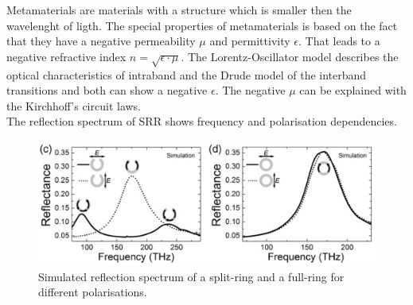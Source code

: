 Metamaterials are materials with a structure which is smaller then the wavelenght of ligth. The special properties of metamaterials is  based on the fact that they have a negative permeability $\mu$ and permittivity $\epsilon$. That leads to a negative refractive index $n = \sqrt{\epsilon \cdot \mu}$. 
The Lorentz-Oscillator model describes the optical characteristics of intraband  and the Drude model of the interband transitions and both can show  a negative $\epsilon$. The negative $\mu$ can be explained with the Kirchhoff's circuit laws. \\
The reflection spectrum of SRR shows frequency and polarisation dependencies.
\begin{figure}[H]
\centering
\includegraphics[scale=1]{../figures/spectrum_theory.png}
\caption{Simulated reflection spectrum of a split-ring and a full-ring for different polarisations. \cite{paper_Giessen_meta}  }
    \label{spectrum_theory}
\end{figure}
